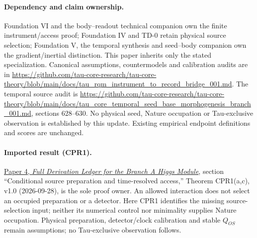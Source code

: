 \documentclass[11pt,a4paper]{article}
\theoremstyle{remark}
\begin{document}
\paragraph{Dependency and claim ownership.}
Foundation VI and the body--readout technical companion own the finite instrument/access proof; Foundation IV and TD-0 retain physical source selection; Foundation V, the temporal synthesis and seed--body companion own the gradient/inertial distinction. This paper inherits only the stated specialization. Canonical assumptions, countermodels and calibration audits are in \url{https://github.com/tau-core-research/tau-core-theory/blob/main/docs/tau_rqm_instrument_to_record_bridge_001.md}. The temporal source audit is \url{https://github.com/tau-core-research/tau-core-theory/blob/main/docs/tau_core_temporal_seed_base_morphogenesis_branch_001.md}, sections 628--630. No physical seed, Nature occupation or Tau-exclusive observation is established by this update. Existing empirical endpoint definitions and scores are unchanged.

\paragraph{Imported result (CPR1).}
\href{https://github.com/tau-core-research/tau-core-higgs-module-paper4/blob/main/paper4_full_derivation/full_derivation.pdf#nameddest=cpr1}{Paper 4, \emph{Full Derivation Ledger for the Branch A Higgs Module}}, section ``Conditional source preparation and time-resolved access,'' Theorem CPR1(a,c), v1.0 (2026-09-28), is the sole proof owner.
An allowed interaction does not select an occupied preparation or a detector. Here CPR1 identifies the missing source-selection input; neither its numerical control nor minimality supplies Nature occupation.
Physical preparation, detector/clock calibration and stable $Q_{OS}$ remain assumptions; no Tau-exclusive observation follows.

\end{document}
